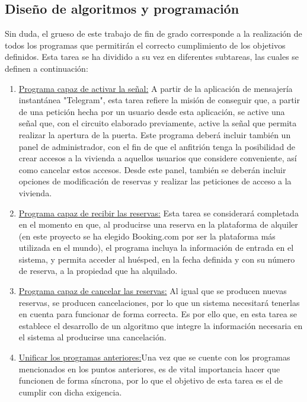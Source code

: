 \subsection{Diseño de algoritmos y programación}
Sin duda, el grueso de este trabajo de fin de grado corresponde a la realización de todos los programas que permitirán el correcto cumplimiento de los objetivos definidos.
Esta tarea se ha dividido a su vez en diferentes subtareas, las cuales se definen a continuación:
\begin{enumerate}

\item \underline{Programa capaz de activar la señal:} A partir de la aplicación de mensajería instantánea "Telegram", esta tarea refiere la misión de conseguir que, a partir de una petición hecha por un usuario desde esta aplicación, se active una señal que, con el circuito elaborado previamente, active la señal que permita realizar la apertura de la puerta.
Este programa deberá incluir también un panel de administrador, con el fin de que el anfitrión tenga la posibilidad de crear accesos a la vivienda a aquellos usuarios que considere conveniente, así como cancelar estos accesos. Desde este panel, también se deberán incluir opciones de modificación de reservas y realizar las peticiones de acceso a la vivienda.
\item \underline{Programa capaz de recibir las reservas:} Esta tarea se considerará completada en el momento en que, al producirse una reserva en la plataforma de alquiler (en este proyecto se ha elegido Booking.com por ser la plataforma más utilizada en el mundo), el programa incluya la información de entrada en el sistema, y permita acceder al huésped, en la fecha definida y con su número de reserva, a la propiedad que ha alquilado.
\item \underline{Programa capaz de cancelar las reservas:} Al igual que se producen nuevas reservas, se producen cancelaciones, por lo que un sistema necesitará tenerlas en cuenta para funcionar de forma correcta. Es por ello que, en esta tarea se establece el desarrollo de un algoritmo que integre la información necesaria en el sistema al producirse una cancelación.
\item \underline{Unificar los programas anteriores:}Una vez que se cuente con los programas mencionados en los puntos anteriores, es de vital importancia hacer que funcionen de forma síncrona, por lo que el objetivo de esta tarea es el de cumplir con dicha exigencia.
\end{enumerate}
